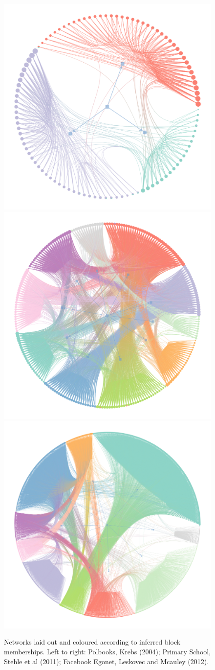 \begin{figure}[!ht]
	\centering
	\includegraphics[width=0.28\linewidth]{img/polbooks-graph.png}
	\includegraphics[width=0.28\linewidth]{img/school-graph.png}
	\includegraphics[width=0.28\linewidth]{img/fb-graph.png}
	\caption{Networks laid out and coloured according to inferred block memberships. Left to right: Polbooks, Krebs (2004); Primary School, Stehle et al (2011); Facebook Egonet, Leskovec and Mcauley (2012).}
	\label{fig:graphs-all}
\end{figure}
%
